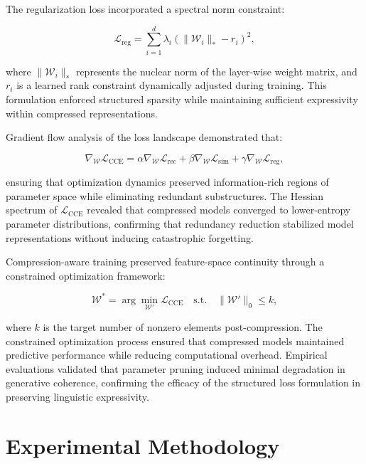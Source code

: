 \documentclass{article}
\begin{document}
The regularization loss incorporated a spectral norm constraint:

\begin{equation}
	\mathcal{L}_{\text{reg}} = \sum_{i=1}^{d} \lambda_i \left( \|\mathcal{W}_i\|_{\ast} - r_i \right)^2,
\end{equation}

where \( \|\mathcal{W}_i\|_{\ast} \) represents the nuclear norm of the layer-wise weight matrix, and \( r_i \) is a learned rank constraint dynamically adjusted during training. This formulation enforced structured sparsity while maintaining sufficient expressivity within compressed representations.

Gradient flow analysis of the loss landscape demonstrated that:

\begin{equation}
	\nabla_{\mathcal{W}} \mathcal{L}_{\text{CCE}} = \alpha \nabla_{\mathcal{W}} \mathcal{L}_{\text{rec}} + \beta \nabla_{\mathcal{W}} \mathcal{L}_{\text{sim}} + \gamma \nabla_{\mathcal{W}} \mathcal{L}_{\text{reg}},
\end{equation}

ensuring that optimization dynamics preserved information-rich regions of parameter space while eliminating redundant substructures. The Hessian spectrum of \( \mathcal{L}_{\text{CCE}} \) revealed that compressed models converged to lower-entropy parameter distributions, confirming that redundancy reduction stabilized model representations without inducing catastrophic forgetting.

Compression-aware training preserved feature-space continuity through a constrained optimization framework:

\begin{equation}
	\mathcal{W}^{*} = \arg \min_{\mathcal{W}'} \mathcal{L}_{\text{CCE}} \quad \text{s.t.} \quad \|\mathcal{W}'\|_0 \leq k,
\end{equation}

where \( k \) is the target number of nonzero elements post-compression. The constrained optimization process ensured that compressed models maintained predictive performance while reducing computational overhead. Empirical evaluations validated that parameter pruning induced minimal degradation in generative coherence, confirming the efficacy of the structured loss formulation in preserving linguistic expressivity.


\section{Experimental Methodology}
\end{document}
